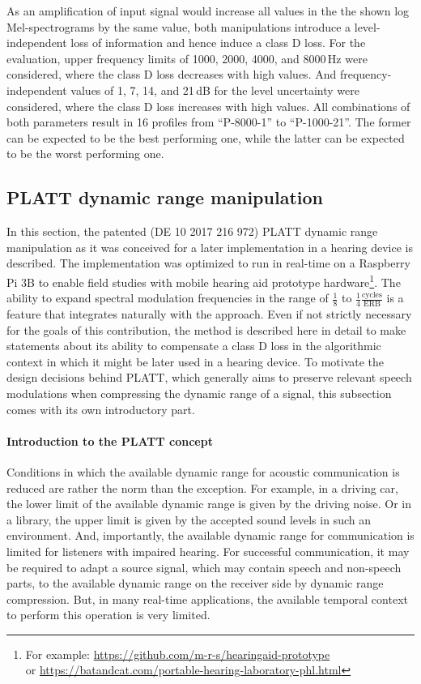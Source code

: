 \documentclass[10pt,a4paper,twocolumn]{article}
\begin{document}
%
As an amplification of input signal would increase all values in the the shown log Mel-spectrograms by the same value, both manipulations introduce a level-independent loss of information and hence induce a class D loss.
%
For the evaluation, upper frequency limits of 1000, 2000, 4000, and 8000\,Hz were considered, where the class D loss decreases with high values.
%
And frequency-independent values of 1, 7, 14, and 21\,dB for the level uncertainty were considered, where the class D loss increases with high values.
%
All combinations of both parameters result in 16 profiles from \enquote{P-8000-1} to \enquote{P-1000-21}.
%
The former can be expected to be the best performing one, while the latter can be expected to be the worst performing one.

\subsection*{PLATT dynamic range manipulation}
\label{sec:platt}
%
In this section, the patented (DE 10 2017 216 972) PLATT dynamic range manipulation as it was conceived for a later implementation in a hearing device is described.
%
The implementation was optimized to run in real-time on a Raspberry Pi 3B to enable field studies with mobile hearing aid prototype hardware\footnote{For example: \url{https://github.com/m-r-s/hearingaid-prototype}\\ or \url{https://batandcat.com/portable-hearing-laboratory-phl.html}}.
%
The ability to expand spectral modulation frequencies in the range of $\frac{1}{8}$ to $\frac{1}{4}\frac{\text{cycles}}{\text{ERB}}$ is a feature that integrates naturally with the approach.
%
Even if not strictly necessary for the goals of this contribution, the method is described here in detail to make statements about its ability to compensate a class D loss in the algorithmic context in which it might be later used in a hearing device.
%
To motivate the design decisions behind PLATT, which generally aims to preserve relevant speech modulations when compressing the dynamic range of a signal, this subsection comes with its own introductory part.

\paragraph{Introduction to the PLATT concept}
%
Conditions in which the available dynamic range for acoustic communication is reduced are rather the norm than the exception.
%
For example, in a driving car, the lower limit of the available dynamic range is given by the driving noise.
%
Or in a library, the upper limit is given by the accepted sound levels in such an environment.
%
And, importantly, the available dynamic range for communication is limited for listeners with impaired hearing.
%
For successful communication, it may be required to adapt a source signal, which may contain speech and non-speech parts, to the available dynamic range on the receiver side by dynamic range compression.
%
But, in many real-time applications, the available temporal context to perform this operation is very limited.
\end{document}
